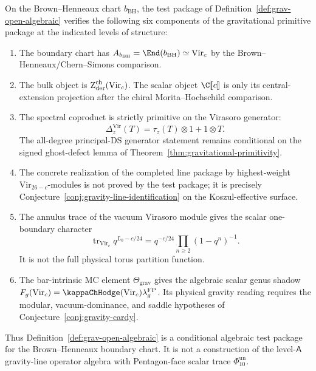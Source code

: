 \begin{proposition}
\label{prop:grav-open-six-requirements}
On the Brown--Henneaux chart \(b_{\mathrm{BH}}\), the test package
of Definition~\textup{\ref{def:grav-open-algebraic}} verifies the
following six components of the gravitational primitive package at the
indicated levels of structure:
\begin{enumerate}[label=\textup{(\roman*)}]
\item The boundary chart has
 \(A_{b_{\mathrm{BH}}}=\End(b_{\mathrm{BH}})\simeq\mathrm{Vir}_c\)
 by the Brown--Henneaux/Chern--Simons comparison.
\item The bulk object is
 \(\operatorname{Z}_{\mathrm{der}}^{\mathrm{ch}}(\mathrm{Vir}_c)\).  The scalar object
 \(\C[\![c]\!]\) is only its central-extension projection after the
 chiral Morita--Hochschild comparison.
\item The spectral coproduct is strictly primitive on the Virasoro
 generator:
 \[
 \Delta_z^{\mathrm{Vir}}(T)
 =
 \tau_z(T)\otimes 1+1\otimes T .
 \]
 The all-degree principal-DS generator statement remains conditional
 on the signed ghost-defect lemma of
 Theorem~\textup{\ref{thm:gravitational-primitivity}}.
\item The concrete realization of the completed line package by
 highest-weight \(\mathrm{Vir}_{26-c}\)-modules is not proved by the
 test package; it is precisely
 Conjecture~\textup{\ref{conj:gravity-line-identification}} on the
 Koszul-effective surface.
\item The annulus trace of the vacuum Virasoro module gives the scalar
 one-boundary character
 \[
 \operatorname{tr}_{\mathrm{Vir}_c} q^{L_0-c/24}
 =
 q^{-c/24}\prod_{n\ge2}(1-q^n)^{-1}.
 \]
 It is not the full physical torus partition function.
\item The bar-intrinsic MC element \(\Theta_{\mathrm{grav}}\) gives
 the algebraic scalar genus shadow
 \(F_g(\mathrm{Vir}_c)=\kappaChHodge(\mathrm{Vir}_c)
 \lambda_g^{\mathrm{FP}}\).  Its physical gravity reading requires
 the modular, vacuum-dominance, and saddle hypotheses of
 Conjecture~\textup{\ref{conj:gravity-cardy}}.
\end{enumerate}
Thus Definition~\textup{\ref{def:grav-open-algebraic}} is a
conditional algebraic test package for the Brown--Henneaux boundary
chart.  It is not a construction of the level-\(\mathsf A\)
gravity-line operator algebra with Pentagon-face scalar trace
\(\Phi_{10}^{\mathrm{un}}\).
\end{proposition}


